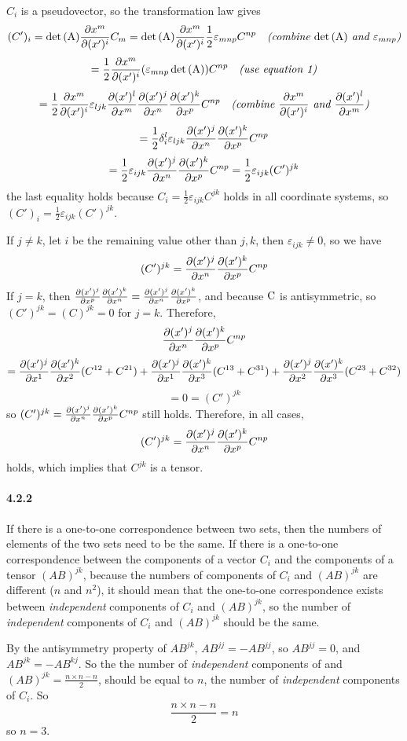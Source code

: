 \documentclass[a4paper]{article}
\begin{document}
$C_i$ is a pseudovector, so the transformation law gives
\[
(C')_i=\det{(\mathrm{A})}\frac{\partial x^m}{\partial(x')^i}C_m=\det{(\mathrm{A)}}\frac{\partial x^m}{\partial(x')^i}\frac{1}{2}\varepsilon_{mnp}C^{np}\quad \textit{(combine $\det{(\mathrm{A})}$ and $\varepsilon_{mnp}$)}
\]
\[
=\frac{1}{2}\frac{\partial x^m}{\partial(x')^i}(\varepsilon_{mnp}\det{(\mathrm{A})})C^{np}\quad\textit{(use equation 1)}
\]
\[
=\frac{1}{2}\frac{\partial x^m}{\partial(x')^i}\varepsilon_{ljk}\frac{\partial(x')^l}{\partial x^m}\frac{\partial(x')^j}{\partial x^n}\frac{\partial(x')^k}{\partial x^p}C^{np}\quad\textit{(combine $\frac{\partial x^m}{\partial(x')^i}$ and $\frac{\partial(x')^l}{\partial x^m}$)}
\]
\[
=\frac{1}{2}\delta^l_i\varepsilon_{ljk}\frac{\partial(x')^j}{\partial x^n}\frac{\partial(x')^k}{\partial x^p}C^{np}
\]
\[
=\frac{1}{2}\varepsilon_{ijk}\frac{\partial(x')^j}{\partial x^n}\frac{\partial(x')^k}{\partial x^p}C^{np}
=\frac{1}{2}\varepsilon_{ijk}(C')^{jk}
\]
the last equality holds because $C_i=\frac{1}{2}\varepsilon_{ijk}C^{jk}$ holds in all coordinate systems, so $(C')_i=\frac{1}{2}\varepsilon_{ijk}(C')^{jk}$.

If $j\neq k$, let $i$ be the remaining value other than $j,k$, then $\varepsilon_{ijk}\neq0$, so we have 
\[
(C')^{jk}=\frac{\partial(x')^j}{\partial x^n}\frac{\partial(x')^k}{\partial x^p}C^{np}
\]
If $j=k$, then $\frac{\partial(x')^j}{\partial x^p}\frac{\partial(x')^k}{\partial x^n}=\frac{\partial(x')^j}{\partial x^n}\frac{\partial(x')^k}{\partial x^p}$, and because $\mathrm{C}$ is antisymmetric, so $(C')^{jk}=(C)^{jk}=0$ for $j=k$. Therefore,
\[
\frac{\partial(x')^j}{\partial x^n}\frac{\partial(x')^k}{\partial x^p}C^{np}\]
\[
=\frac{\partial(x')^j}{\partial x^1}\frac{\partial(x')^k}{\partial x^2}(C^{12}+C^{21})+
\frac{\partial(x')^j}{\partial x^1}\frac{\partial(x')^k}{\partial x^3}(C^{13}+C^{31})+
\frac{\partial(x')^j}{\partial x^2}\frac{\partial(x')^k}{\partial x^3}(C^{23}+C^{32})
\]
\[
=0=(C')^{jk}
\]
so $(C')^{jk}=\frac{\partial(x')^j}{\partial x^n}\frac{\partial(x')^k}{\partial x^p}C^{np}$ still holds. Therefore, in all cases,
\[
(C')^{jk}=\frac{\partial(x')^j}{\partial x^n}\frac{\partial(x')^k}{\partial x^p}C^{np}
\]
holds, which implies that $C^{jk}$ is a tensor.

\paragraph{4.2.2}
If there is a one-to-one correspondence between two sets, then the numbers of elements of the two sets need to be the same. If there is a one-to-one correspondence between the components of a vector $C_i$ and the components of a tensor $(AB)^{jk}$, because the numbers of components of $C_i$ and $(AB)^{jk}$ are different ($n$ and $n^2$), it should mean that the one-to-one correspondence exists between \textit{independent} components of $C_i$ and $(AB)^{jk}$, so the number of \textit{independent} components of $C_i$ and $(AB)^{jk}$ should be the same.

By the antisymmetry property of ${AB}^{jk}$, ${AB}^{jj}=-{AB}^{jj}$, so ${AB}^{jj}=0$, and ${AB}^{jk}=-{AB}^{kj}$. So the  the number of \textit{independent} components of and $(AB)^{jk}=\frac{n\times n-n}{2}$, should be equal to $n$,  the number of \textit{independent} components of $C_i$. So
\[
\frac{n\times n-n}{2}=n
\]
so $n=3$.
\end{document}
